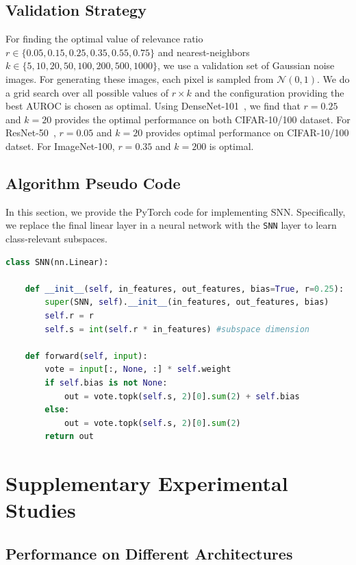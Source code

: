 \documentclass[letterpaper]{article} %
\theoremstyle{plain}
\theoremstyle{definition}
\theoremstyle{remark}
\begin{document}
\subsection{Validation Strategy}
\label{app:validation}
For finding the optimal value of relevance ratio $r\in\{0.05,0.15,0.25,0.35,0.55,0.75\}$ and nearest-neighbors $k\in\{5,10,20,50,100,200,500,1000\}$, we use a validation set of Gaussian noise images. For generating these images, each pixel is sampled from $\mathcal{N} (0, 1)$. We do a grid search over all possible values of $r \times k$ and the configuration providing the best AUROC is chosen as optimal. Using DenseNet-101~\cite{huang2018densely}, we find that $r = 0.25$ and $k=20$ provides the optimal performance on both CIFAR-10/100 dataset. For ResNet-50~\cite{he2016deep}, $r=0.05$ and $k=20$ provides optimal performance on CIFAR-10/100 datset. For ImageNet-100, $r = 0.35$ and $k=200$ is optimal.



\subsection{Algorithm Pseudo Code}
\label{app:pseudo}
In this section, we provide the PyTorch code for implementing SNN. Specifically, we replace the final linear layer in a neural network with the \verb|SNN| layer to learn class-relevant subspaces.


{\small
\begin{lstlisting}[language=Python]
class SNN(nn.Linear):

    def __init__(self, in_features, out_features, bias=True, r=0.25):
        super(SNN, self).__init__(in_features, out_features, bias)
        self.r = r
        self.s = int(self.r * in_features) #subspace dimension

    def forward(self, input):
        vote = input[:, None, :] * self.weight
        if self.bias is not None:
            out = vote.topk(self.s, 2)[0].sum(2) + self.bias
        else:
            out = vote.topk(self.s, 2)[0].sum(2)
        return out

\end{lstlisting}}
\section{Supplementary Experimental Studies}
\subsection{Performance on Different Architectures}
\label{app:diff_arch}
\end{document}
